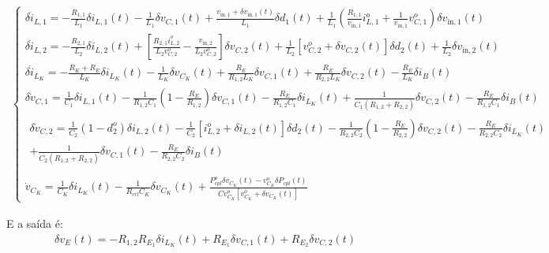 \begin{gather}
  \begin{cases}
    \delta \dot{i}_{L,1} = - \frac{R_{1,1}}{L_1} \delta i_{L,1}(t) - \frac{1}{L_1} \delta v_{C,1}(t)
    + \frac{v_{\text{in}, 1} + \delta v_{\text{in}, 1}(t)}{L_1} \delta d_1(t) +
    \frac{1}{L_1} \left(\frac{R_{1,1}}{v_{\text{in}, 1}} i_{L,1}^o + \frac{1}{v_{\text{in}, 1}} v_{C,1}^o\right) \delta v_{\text{in}, 1}(t)                                                                                                         \\[12pt]
    \delta \dot{i}_{L,2} = - \frac{R_{2,1}}{L_2} \delta i_{L,2}(t)
    + \left[\frac{R_{2,1} i_{L,2}^o}{L_2 v_{C,2}^o} - \frac{v_{\text{in},2}}{L_2 v_{C,2}^o}\right] \delta v_{C,2}(t) + \frac{1}{L_2} \left[v_{C,2}^o + \delta v_{C,2}(t)\right] \delta d_2(t) + \frac{1}{L_2} \delta v_{\text{in},2}(t)               \\[12pt]
    \delta \dot{i}_{L_K} = - \frac{R_K + R_E}{L_K} \delta i_{L_K}(t)
    - \frac{1}{L_K} \delta v_{C_K}(t)
    + \frac{R_E}{{R_{1,2}}L_K} \delta v_{C,1}(t)
    + \frac{R_E}{R_{2,2}L_K} \delta v_{C,2}(t)
    - \frac{R_E}{L_K} \delta i_B(t)                                                                                                                                                                                                                     \\[12pt]
    \delta \dot v_{C,1} = \frac{1}{C_1} \delta i_{L,1}(t)
    - \frac{1}{R_{1,2}C_1} \left(1 - \frac{R_E}{{R_{1,2}}}\right) \delta v_{C,1}(t)
    - \frac{R_E}{R_{1,2} C_1} \delta i_{L_K}(t)
    + \frac{1}{C_1 (R_{1,2} + R_{2,2})} \delta v_{C,2}(t)
    - \frac{R_E}{R_{1,2} C_1} \delta i_B(t)                                                                                                                                                                                                             \\[12pt]
    \begin{aligned}
      \delta \dot v_{C,2} = \frac{1}{C_2} (1 - d_2^o) \delta i_{L,2}(t) - \frac{1}{C_2} \left[i_{L,2}^o + \delta i_{L,2}(t)\right] \delta d_2(t)
      - \frac{1}{R_{2,2}C_2} \left(1 - \frac{R_E}{R_{2,2}}\right) \delta v_{C,2}(t)
      - \frac{R_E}{R_{2,2} C_2} \delta i_{L_K}(t) \\+ \frac{1}{C_2(R_{1,2} + R_{2,2})}  \delta v_{C,1}(t) - \frac{R_E}{R_{2,2} C_2} \delta i_B(t) \\[12pt]
    \end{aligned} \\
    \dot{v}_{C_K} = \frac{1}{C_K} \delta i_{L_K}(t)
    - \frac{1}{R_{crl} C_K} \delta v_{C_K}(t)
    + \frac{P_{cpl}^o \delta v_{C_K}(t) - v_{C_K}^o \delta P_{cpl}(t)}{Cv_{C_K}^o\left[v_{C_K}^o + \delta v_{C_K}(t)\right]}
  \end{cases}
\end{gather}

E a saída é:
\begin{gather}
  \delta v_E(t) = - R_{1,2} R_{E_1} \delta i_{L_K}(t) + R_{E_1} \delta v_{C,1}(t) + R_{E_2} \delta v_{C,2}(t)
\end{gather}
